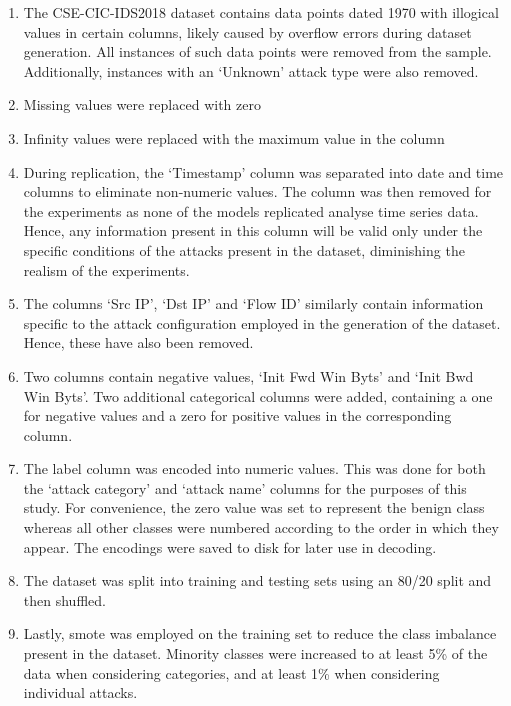 \begin{enumerate}
      \item The CSE-CIC-IDS2018 dataset contains data points dated 1970 with illogical
            values in certain columns, likely caused by overflow errors during dataset
            generation. All instances of such data points were removed from the sample.
            Additionally, instances with an `Unknown' attack type were also removed.
      \item Missing values were replaced with zero
      \item Infinity values were replaced with the maximum value in the column
      \item During replication, the `Timestamp' column was separated into date and time
            columns to eliminate non-numeric values. The column was then removed for the
            experiments as none of the models replicated analyse time series data. Hence,
            any information present in this column will be valid only under the specific
            conditions of the attacks present in the dataset, diminishing the realism of
            the experiments.
      \item The columns `Src IP', `Dst IP' and `Flow ID' similarly contain information
            specific to the attack configuration employed in the generation of the dataset.
            Hence, these have also been removed.
      \item Two columns contain negative values, `Init Fwd Win Byts' and `Init Bwd Win
            Byts'. Two additional categorical columns were added, containing a one for
            negative values and a zero for positive values in the corresponding column.
      \item The label column was encoded into numeric values. This was done for both the
            `attack category' and `attack name' columns for the purposes of this study. For
            convenience, the zero value was set to represent the benign class whereas all
            other classes were numbered according to the order in which they appear. The
            encodings were saved to disk for later use in decoding.
      \item The dataset was split into training and testing sets using an 80/20 split and
            then shuffled.
      \item Lastly, \gls{smote} was employed on the training set to reduce the class
            imbalance present in the dataset. Minority classes were increased to at least
            5\% of the data when considering categories, and at least 1\% when considering
            individual attacks.
\end{enumerate}

